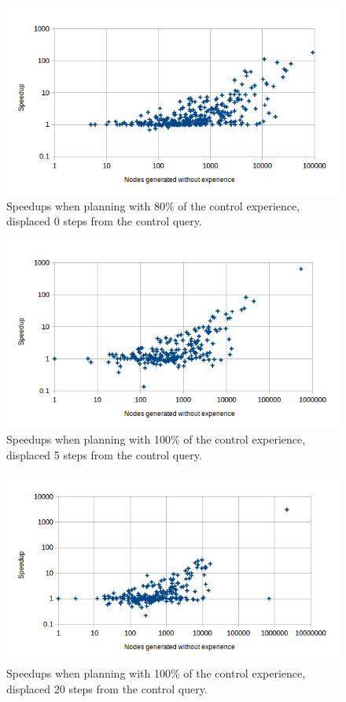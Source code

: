 \documentclass[letterpaper]{article}
\begin{document}
\begin{figure}
	\centering
	\includegraphics[scale=0.5]{Speedup_80_0.png}
	\caption{Speedups when planning with 80\% of the control experience, displaced 0 steps from the control query.}
	 \label{fig:s_80_0}
\end{figure}

\begin{figure}
	\centering
	\includegraphics[scale=0.5]{Speedup_100_5.png}
	\caption{Speedups when planning with 100\% of the control experience, displaced 5 steps from the control query.}
	 \label{fig:s_100_5}
\end{figure}

\begin{figure}
	\centering
	\includegraphics[scale=0.5]{Speedup_100_20.png}
	\caption{Speedups when planning with 100\% of the control experience, displaced 20 steps from the control query.}
	 \label{fig:s_100_20}
\end{figure}
\end{document}
